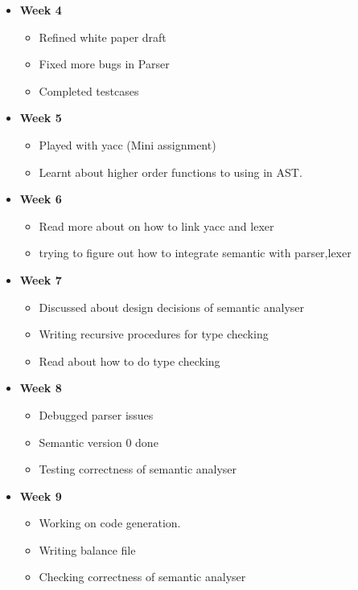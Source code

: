 \documentclass[english,a4paper,12pt]{report}
\begin{document}
\begin{itemize}
\begin{itemize}
        
    \end{itemize}
        \item \textbf{Week 4} \begin{itemize}
        \item  Refined white paper draft
        \item Fixed more bugs in Parser
        \item Completed testcases

    \end{itemize}
        \item \textbf{Week 5 }\begin{itemize}
        \item Played with yacc (Mini assignment)
        \item Learnt about higher order functions to using in AST.
    
        
    \end{itemize}
        \item \textbf{Week 6} \begin{itemize}
        \item Read more about on how to link yacc and lexer
        \item trying to figure out how to integrate semantic with parser,lexer

        
    \end{itemize}
        \item\textbf{ Week 7 }\begin{itemize}
        \item Discussed about design decisions of semantic analyser 
        \item Writing recursive procedures for type checking
        \item Read about how to do type checking
   
        
    \end{itemize}
        \item \textbf{Week 8} \begin{itemize}
        \item Debugged parser issues
        \item Semantic version 0 done
        \item  Testing correctness of semantic analyser
     
        
    \end{itemize}
        \item \textbf{Week 9 }\begin{itemize}
        \item Working on code generation.
        \item Writing balance file
        \item Checking correctness of semantic analyser
   

\end{itemize}
\end{itemize}
\end{document}
